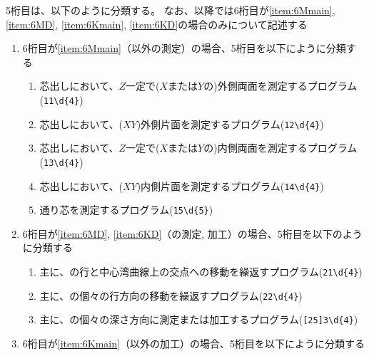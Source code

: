 \clearpage
5桁目は、以下のように分類する。
なお、以降では6桁目が\ref{item:6Mmain}, \ref{item:6MD}, \ref{item:6Kmain}, \ref{item:6KD}の場合のみについて記述する
\begin{enumerate}[label=\alph*)]
\item 6桁目が\ref{item:6Mmain}（\dimple 以外の測定）の場合、5桁目を以下にように分類する
  \begin{enumerate}[label=\arabic*., ref=\arabic*, start=1]
  \item\label{item:5MCOBsZ} 芯出しにおいて、$Z$一定で($X$または$Y$の)外側両面を測定するプログラム(\verb|11\d{4}|)
  \item\label{item:5MCOO} 芯出しにおいて、($XY$)外側片面を測定するプログラム(\verb|12\d{4}|)
  \item\label{item:5MCIB} 芯出しにおいて、$Z$一定で($X$または$Y$の)内側両面を測定するプログラム(\verb|13\d{4}|)
  \item\label{item:5MCIO} 芯出しにおいて、($XY$)内側片面を測定するプログラム(\verb|14\d{4}|)
  \item\label{item:5MCL} 通り芯を測定するプログラム(\verb|15\d{5}|)
  \end{enumerate}
\item 6桁目が\ref{item:6MD}, \ref{item:6KD}（\dimple の測定, 加工）の場合、5桁目を以下のように分類する
  \begin{enumerate}[label=\arabic*., ref=\arabic*]
  \item 主に、\expandafterindex{\dimplekana@\dimple}\dimple の行と中心湾曲線上の交点への移動を繰返すプログラム(\verb|21\d{4}|)
  \item 主に、\dimple の個々の行方向の移動を繰返すプログラム(\verb|22\d{4}|)
  \item 主に、\dimple の個々の深さ方向に測定または加工するプログラム(\verb|[25]3\d{4}|)
  \end{enumerate}
\item 6桁目が\ref{item:6Kmain}（\dimple 以外の加工）の場合、5桁目を以下にように分類する

\end{enumerate}

